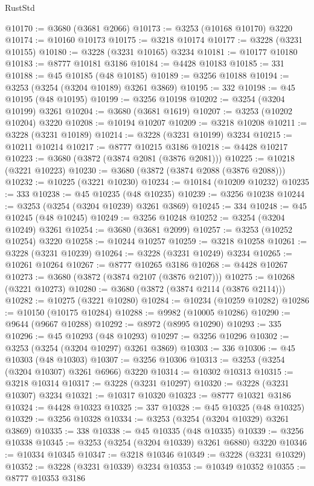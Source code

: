 \begin{lexlean}{RustStd}
\begin{coremodule}
@10170 := @3680 (@3681 @2066)
@10173 := @3253 (@10168 @10170) @3220
@10174 := @10160 @10173
@10175 := @3218 @10174
@10177 := @3228 (@3231 @10155)
@10180 := @3228 (@3231 @10165) @3234
@10181 := @10177 @10180
@10183 := @8777 @10181 @3186
@10184 := @4428 @10183
@10185 := 331
@10188 := @45 @10185 (@48 @10185)
@10189 := @3256 @10188
@10194 := @3253 (@3254 (@3204 @10189) @3261 @3869)
@10195 := 332
@10198 := @45 @10195 (@48 @10195)
@10199 := @3256 @10198
@10202 := @3254 (@3204 @10199) @3261
@10204 := @3680 (@3681 @1619)
@10207 := @3253 (@10202 @10204) @3220
@10208 := @10194 @10207
@10209 := @3218 @10208
@10211 := @3228 (@3231 @10189)
@10214 := @3228 (@3231 @10199) @3234
@10215 := @10211 @10214
@10217 := @8777 @10215 @3186
@10218 := @4428 @10217
@10223 := @3680 (@3872 (@3874 @2081 (@3876 @2081)))
@10225 := @10218 (@3221 @10223)
@10230 := @3680 (@3872 (@3874 @2088 (@3876 @2088)))
@10232 := @10225 (@3221 @10230)
@10234 := @10184 (@10209 @10232)
@10235 := 333
@10238 := @45 @10235 (@48 @10235)
@10239 := @3256 @10238
@10244 := @3253 (@3254 (@3204 @10239) @3261 @3869)
@10245 := 334
@10248 := @45 @10245 (@48 @10245)
@10249 := @3256 @10248
@10252 := @3254 (@3204 @10249) @3261
@10254 := @3680 (@3681 @2099)
@10257 := @3253 (@10252 @10254) @3220
@10258 := @10244 @10257
@10259 := @3218 @10258
@10261 := @3228 (@3231 @10239)
@10264 := @3228 (@3231 @10249) @3234
@10265 := @10261 @10264
@10267 := @8777 @10265 @3186
@10268 := @4428 @10267
@10273 := @3680 (@3872 (@3874 @2107 (@3876 @2107)))
@10275 := @10268 (@3221 @10273)
@10280 := @3680 (@3872 (@3874 @2114 (@3876 @2114)))
@10282 := @10275 (@3221 @10280)
@10284 := @10234 (@10259 @10282)
@10286 := @10150 (@10175 @10284)
@10288 := @9982 (@10005 @10286)
@10290 := @9644 (@9667 @10288)
@10292 := @8972 (@8995 @10290)
@10293 := 335
@10296 := @45 @10293 (@48 @10293)
@10297 := @3256 @10296
@10302 := @3253 (@3254 (@3204 @10297) @3261 @3869)
@10303 := 336
@10306 := @45 @10303 (@48 @10303)
@10307 := @3256 @10306
@10313 := @3253 (@3254 (@3204 @10307) @3261 @6966) @3220
@10314 := @10302 @10313
@10315 := @3218 @10314
@10317 := @3228 (@3231 @10297)
@10320 := @3228 (@3231 @10307) @3234
@10321 := @10317 @10320
@10323 := @8777 @10321 @3186
@10324 := @4428 @10323
@10325 := 337
@10328 := @45 @10325 (@48 @10325)
@10329 := @3256 @10328
@10334 := @3253 (@3254 (@3204 @10329) @3261 @3869)
@10335 := 338
@10338 := @45 @10335 (@48 @10335)
@10339 := @3256 @10338
@10345 := @3253 (@3254 (@3204 @10339) @3261 @6880) @3220
@10346 := @10334 @10345
@10347 := @3218 @10346
@10349 := @3228 (@3231 @10329)
@10352 := @3228 (@3231 @10339) @3234
@10353 := @10349 @10352
@10355 := @8777 @10353 @3186

\end{coremodule}
\end{lexlean}
